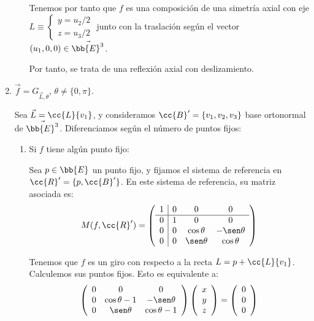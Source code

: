 \begin{enumerate}
\begin{enumerate}
        Tenemos por tanto que $f$ es una composición de una simetría axial con eje $L\equiv \left\{\begin{array}{cc}
            y=u_2/2 \\
            z=u_3/2
        \end{array}\right.$ junto con la traslación según el vector $(u_1,0,0)\in \vec{\bb{E}^3}$.

        Por tanto, se trata de una reflexión axial con deslizamiento.

    \end{enumerate}
    
    \item $\vec{f} = G_{\vec{L}, \theta}$, $\theta\neq\{0,\pi\}$.

    Sea $\vec{L}=\cc{L}\{v_1\}$, y consideramos $\cc{B}'=\{v_1,v_2,v_3\}$ base ortonormal de $\vec{\bb{E}^3}$. Diferenciamos según el número de puntos fijos:
    \begin{enumerate}
        \item Si $f$ tiene algún punto fijo:

        Sea $p\in \bb{E}$ un punto fijo, y fijamos el sistema de referencia en $\cc{R}'=\{p,\cc{B}'\}$. En este sistema de referencia, su matriz asociada es:
        \begin{equation*}
            M(f,\cc{R}') = \left(\begin{array}{c|ccc}
                1 & 0 & 0 & 0 \\ \hline
                0 & 1 & 0 & 0\\ 
                0 & 0 & \cos\theta & -\sen\theta \\
                0 & 0 & \sen\theta & \cos\theta
            \end{array}\right)
        \end{equation*}

        Tenemos que $f$ es un giro con respecto a la recta $L=p+\cc{L}\{v_1\}$. Calculemos sus puntos fijos. Esto es equivalente a:
        \begin{equation*}
            \left(\begin{array}{ccc}
                0 & 0 & 0\\ 
                0 & \cos\theta-1 & -\sen\theta \\
                0 & \sen\theta & \cos\theta-1
            \end{array}\right)
            \left(\begin{array}{c}
                x\\y\\z
            \end{array}\right)
            = \left(\begin{array}{c}
                0\\0\\0
            \end{array}\right)
        \end{equation*}


\end{enumerate}
\end{enumerate}

